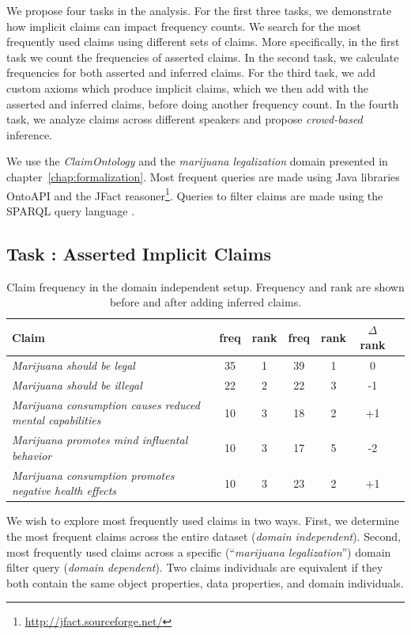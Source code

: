 We propose four tasks in the analysis. For the first three tasks, 
we demonstrate how implicit claims can impact frequency counts.
We search for the most frequently used claims using different sets
of claims. More specifically, in the first task we count 
the frequencies of asserted claims. In the second task, we 
calculate frequencies for both asserted and inferred
claims. For the third task, we add custom axioms which produce implicit claims,
which we then add with the asserted and inferred claims, before
doing another frequency count. In the fourth task, we analyze claims
across different speakers and propose \emph{crowd-based} inference.

We use the \emph{ClaimOntology} and the \emph{marijuana legalization} domain
presented in chapter~\ref{chap:formalization}. Most frequent queries 
are made using Java libraries OntoAPI \citep{bellatreche2007ontoapi} and 
the JFact reasoner\footnote{\url{http://jfact.sourceforge.net/}}.
Queries to filter claims are made using the SPARQL query language
\citep{perez2006semantics}.

\subsection{Task : Asserted Implicit Claims}

\begin{table}[t]
\centering
\begin{tabular}{p{9 cm} | cc | cc | cc}
	\toprule
	\textbf{Claim} & freq & rank & freq & rank & $\Delta$rank \\
\midrule
	\emph{Marijuana should be legal 				}& 35 & 1 & 39 & 1 & 0 \\
	\emph{Marijuana should be illegal 				}& 22 & 2 & 22 & 3 & -1 \\
	\emph{Marijuana consumption causes reduced mental capabilities} & 10 & 3 & 18 & 2 & +1 \\
	\emph{Marijuana promotes mind influental behavior 		}& 10 & 3 & 17 & 5 & -2 \\
	\emph{Marijuana consumption promotes negative health effects 	}& 10 & 3 & 23 & 2 & +1 \\
\bottomrule 
\end{tabular}
\caption{Claim frequency in the domain independent setup. Frequency and rank are
	shown before and after adding inferred claims. }
\label{tab:claim_freq_indep}
\end{table}

We wish to explore most frequently used claims in two ways.
First, we determine the most frequent claims across the entire dataset
(\emph{domain independent}).
Second, most frequently used claims across a specific 
(``\emph{marijuana legalization}'') domain filter query
(\emph{domain dependent}). 
Two claims individuals are equivalent if they both contain the same
object properties, data properties, and domain individuals. 

